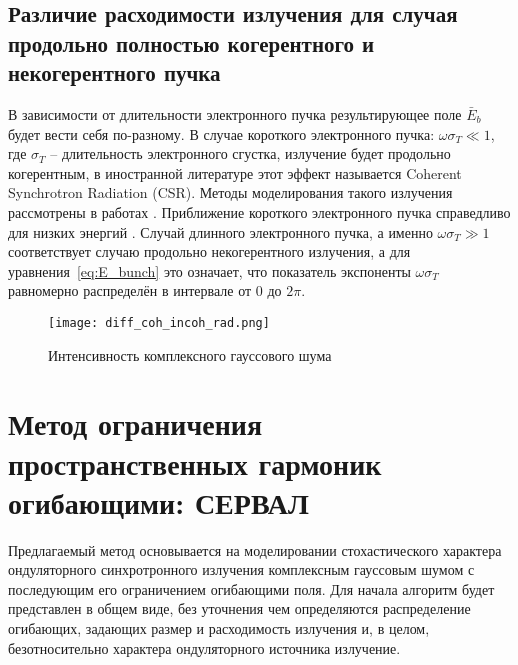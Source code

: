 \subsection{Различие расходимости излучения для случая продольно полностью когерентного и некогерентного пучка}
В зависимости от длительности электронного пучка результирующее поле $\bar{E}_{b}$ будет вести себя по-разному. В случае короткого электронного пучка: $\omega \sigma_T \ll 1$, где $\sigma_T$ -- длительность электронного сгустка, излучение будет продольно когерентным, в иностранной литературе этот эффект называется Coherent Synchrotron Radiation (CSR). Методы моделирования такого излучения рассмотрены в работах . Приближение короткого электронного пучка справедливо для низких энергий . Случай длинного электронного пучка, а именно  $\omega \sigma_T \gg 1$ соответствует случаю продольно некогерентного излучения, а для уравнения~\ref{eq:E_bunch} это означает, что показатель экспоненты $\omega \sigma_T$ равномерно распределён в интервале от $0$ до $2 \pi$. 


\begin{figure}[H] 
	\centering 	\texttt{[image: diff\_coh\_incoh\_rad.png]}
	\caption{Интенсивность комплексного гауссового шума }
	\label{fig:diff_coh_incoh_rad}
\end{figure}
\section{Метод ограничения пространственных гармоник огибающими: СЕРВАЛ}
Предлагаемый метод основывается на моделировании стохастического характера ондуляторного синхротронного излучения комплексным гауссовым шумом с последующим его ограничением огибающими поля. Для начала алгоритм будет представлен в общем виде, без уточнения чем определяются распределение огибающих, задающих размер и расходимость излучения и, в целом, безотносительно характера ондуляторного источника излучение. 
